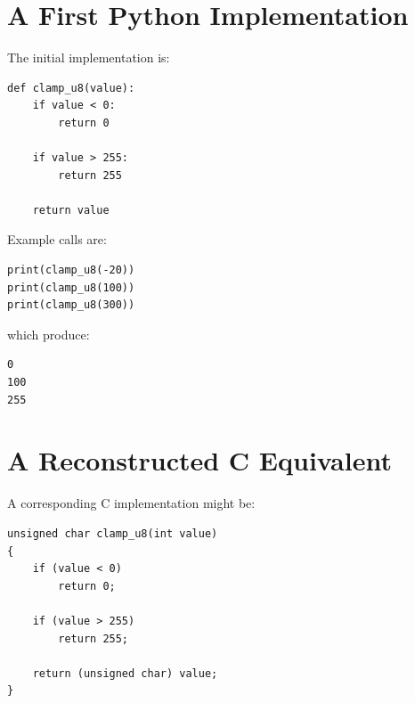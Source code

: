 \section{A First Python Implementation}
\label{sec:first-clamp}

The initial implementation is:

\begin{listing}[htbp]
    \caption{A first implementation of unsigned 8-bit clamping.}
    \label{lst:first-clamp-python}

\begin{verbatim}
def clamp_u8(value):
    if value < 0:
        return 0

    if value > 255:
        return 255

    return value
\end{verbatim}

\end{listing}

Example calls are:

\begin{verbatim}
print(clamp_u8(-20))
print(clamp_u8(100))
print(clamp_u8(300))
\end{verbatim}

which produce:

\begin{verbatim}
0
100
255
\end{verbatim}


\section{A Reconstructed C Equivalent}
\label{sec:clamp-c}

A corresponding C implementation might be:

\begin{listing}[htbp]
    \caption{A reconstructed C implementation of unsigned 8-bit
    clamping.}
    \label{lst:clamp-u8-c}

\begin{verbatim}
unsigned char clamp_u8(int value)
{
    if (value < 0)
        return 0;

    if (value > 255)
        return 255;

    return (unsigned char) value;
}
\end{verbatim}

\end{listing}

